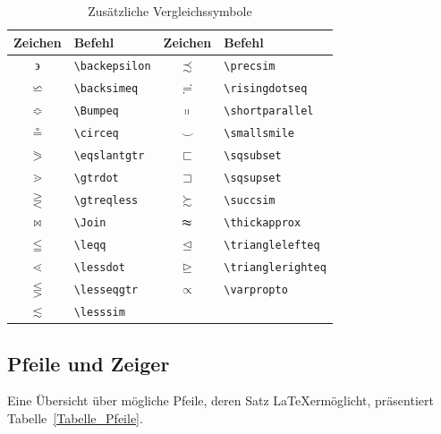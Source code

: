 \documentclass[a4paper,10pt,twoside]{scrbook}
\begin{document}
{\begin{table}[h!tb]
\centering
\caption{Zusätzliche Vergleichssymbole}
\label{Tabelle_Zusaetzliche_Vergleichssymbole}       %
\begin{tabular}{clcl}
\hline
Zeichen & Befehl & Zeichen & Befehl  \\
\hline
$\backepsilon$ & \texttt{\textbackslash backepsilon} &
$\precsim$ & \texttt{\textbackslash precsim} \\
$\backsimeq$ & \texttt{\textbackslash backsimeq} &
$\risingdotseq$ & \texttt{\textbackslash risingdotseq} \\
$\Bumpeq$ & \texttt{\textbackslash Bumpeq} &
$\shortparallel$ & \texttt{\textbackslash shortparallel} \\
$\circeq$ & \texttt{\textbackslash circeq} &
$\smallsmile$ & \texttt{\textbackslash smallsmile} \\
$\eqslantgtr$ & \texttt{\textbackslash eqslantgtr} &
$\sqsubset$ & \texttt{\textbackslash sqsubset} \\
$\gtrdot$ & \texttt{\textbackslash gtrdot} &
$\sqsupset$ & \texttt{\textbackslash sqsupset} \\
$\gtreqless$ & \texttt{\textbackslash gtreqless} &
$\succsim$ & \texttt{\textbackslash succsim} \\
$\Join$ & \texttt{\textbackslash Join} &
$\thickapprox$ & \texttt{\textbackslash thickapprox} \\
$\leqq$ & \texttt{\textbackslash leqq} &
$\trianglelefteq$ & \texttt{\textbackslash trianglelefteq} \\
$\lessdot$ & \texttt{\textbackslash lessdot} &
$\trianglerighteq$ & \texttt{\textbackslash trianglerighteq} \\
$\lesseqgtr$ & \texttt{\textbackslash lesseqgtr} &
$\varpropto$ & \texttt{\textbackslash varpropto} \\
$\lesssim$ & \texttt{\textbackslash lesssim} & & \\
\hline
\end{tabular}
\end{table}


\subsection{Pfeile und Zeiger}


Eine Übersicht über mögliche Pfeile, deren Satz \LaTeX ermöglicht, präsentiert Tabelle~\ref{Tabelle_Pfeile}.



}
\end{document}
